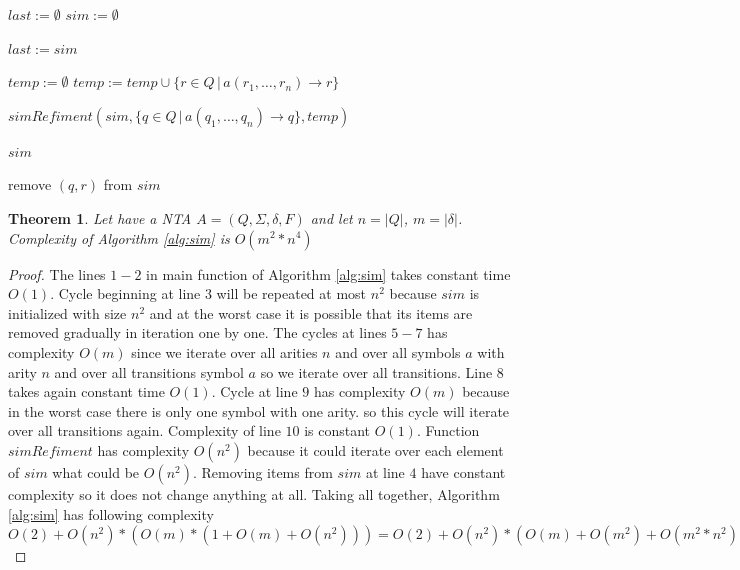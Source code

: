 \documentclass[a4paper, 12pt]{article}
\let\oldnl\nl%
\newcommand{\nonl}{\renewcommand{\nl}{\let\nl\oldnl}}%
\newtheorem{theorem}{Theorem}
\begin{document}
\begin{algorithm}[h]
    
	$last := \emptyset $\;
    $sim := \emptyset $\;
	{
		$last := sim$\;
		{
			{
				{
					$temp := \emptyset$\;
					{
						$temp := temp \cup \{r \in Q \,|\, a(r_1,\ldots, r_n) \rightarrow r\}$\;
					}

					$simRefiment(sim, \{q \in Q \,|\, a(q_1,\ldots, q_n) \rightarrow q\}, temp)$\;
				}
			}
		}

	}
	\Return $sim$\;
	\DontPrintSemicolon \nonl\;
	\setcounter{AlgoLine}{0}

	\nonl {}
	{
		{
			{
				{
					remove $(q,r)$ from $sim$ \;
				}
			}
		}
	 }
	 \caption{Computing simulation on a NTA. The algorithm is based on the one in \cite{lengal:trees}}
\label{alg:sim}
\end{algorithm}

\begin{theorem}
	\label{the:nfacompl}
Let have a NTA $A = (Q, \Sigma, \delta, F)$ and let $n = |Q|$, $m = |\delta|$.
Complexity of Algorithm \ref{alg:sim} is $O(m^2*n^4)$
\end{theorem}

\begin{proof}
	The lines $1-2$ in main function of Algorithm \ref{alg:sim} takes constant time $O(1)$.
	Cycle beginning at line $3$ will be repeated at most $n^2$ because $sim$ is initialized with size $n^2$
	and at the worst case it is possible that its items are removed gradually in iteration one by one.
	The cycles at lines $5-7$ has complexity $O(m)$ since we iterate over all arities $n$ and over all symbols $a$ with arity $n$
	and over all transitions symbol $a$ so we iterate over all transitions.
	Line $8$ takes again constant time $O(1)$.
	Cycle at line $9$ has complexity $O(m)$ because in the worst case there is only one symbol with one arity.
	so this cycle will iterate over all transitions again.
	Complexity of line $10$ is constant $O(1)$.
	Function $simRefiment$ has complexity $O(n^2)$ because it could iterate over each element of $sim$ what could be $O(n^2)$.
	Removing items from $sim$ at line $4$ have constant complexity so it does not change anything at all.
	Taking all together, Algorithm \ref{alg:sim} has following complexity 
	$O(2) + O(n^2)*(O(m)*(1+O(m)+O(n^2)))=
	O(2) + O(n^2)*(O(m)+O(m^2)+O(m^2*n^2)) =
	O(n^2)*(O(m^2*n^2)) =
	O(m^2*n^4)$
\end{proof}
\end{document}
